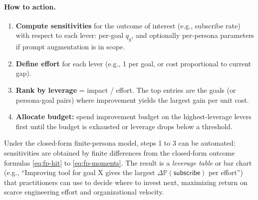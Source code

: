 \paragraph{How to action.}
\begin{enumerate}
  \item \textbf{Compute sensitivities} for the outcome of interest (e.g., subscribe rate) with respect to each lever: per-goal $q_g$, and optionally per-persona parameters if prompt augmentation is in scope.
  \item \textbf{Define effort} for each lever (e.g., 1 per goal, or cost proportional to current gap).
  \item \textbf{Rank by leverage} = impact / effort. The top entries are the goals (or persona-goal pairs) where improvement yields the largest gain per unit cost.
  \item \textbf{Allocate budget:} spend improvement budget on the highest-leverage levers first until the budget is exhausted or leverage drops below a threshold.
\end{enumerate}
Under the closed-form finite-persona model, steps 1 to 3 can be automated: sensitivities are obtained by finite differences from the closed-form outcome formulas \eqref{eq:fp-hit} to \eqref{eq:fp-moments}. The result is a \emph{leverage table} or bar chart (e.g., ``Improving tool for goal X gives the largest $\Delta \mathbb{P}(\mathsf{subscribe})$ per effort'') that practitioners can use to decide where to invest next, maximizing return on scarce engineering effort and organizational velocity.
